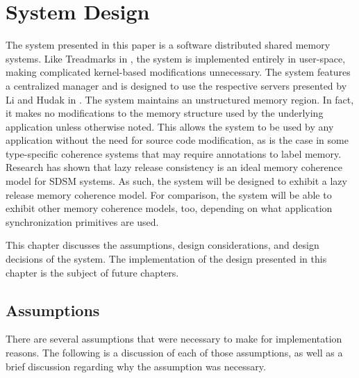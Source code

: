 \section{System Design}
\label{system-design}

The \projname{} system presented in this paper is a software distributed shared memory systems.  Like Treadmarks in \cite{Amza:1996:TSM:226705.226708,Keleher:1994:TDS:1267074.1267084}, the \projname{} system is implemented entirely in user-space, making complicated kernel-based modifications unnecessary.  The \projname{} system features a centralized manager and is designed to use the respective servers presented by Li and Hudak in \cite{Li:1989:MCS:75104.75105}.  The \projname{} system maintains an unstructured memory region.  In fact, it makes no modifications to the memory structure used by the underlying application unless otherwise noted.  This allows the \projname{} system to be used by any application without the need for source code modification, as is the case in some type-specific coherence systems that may require annotations to label memory.  Research has shown that lazy release consistency is an ideal memory coherence model for SDSM systems.  As such, the \projname{} system will be designed to exhibit a lazy release memory coherence model.  For comparison, the \projname{} system will be able to exhibit other memory coherence models, too, depending on what application synchronization primitives are used.

This chapter discusses the assumptions, design considerations, and design decisions of the \projname{} system.  The implementation of the design presented in this chapter is the subject of future chapters.

\subsection{Assumptions}
\label{assumptions}

There are several assumptions that were necessary to make for implementation reasons.  The following is a discussion of each of those assumptions, as well as a brief discussion regarding why the assumption was necessary.

